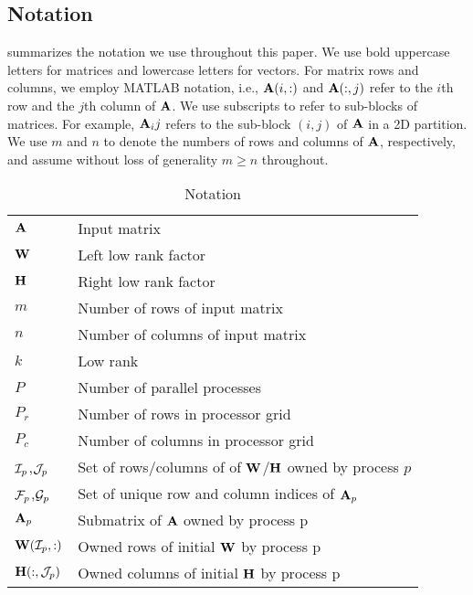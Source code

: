 \subsection{Notation}
\label{sec:notations}

 summarizes the notation we use throughout this paper.
We use bold uppercase letters for matrices and lowercase letters for vectors.
For matrix rows and columns, we employ MATLAB notation, i.e., $\AA(i, :)$ and $\AA(:, j)$ refer to the $i$th row and the $j$th column of $\AA$.
We use subscripts to refer to sub-blocks of matrices.
For example, $\AA_ij$ refers to the sub-block $(i, j)$ of $\AA$ in a 2D partition.
We use $m$ and $n$ to denote the numbers of rows and columns of $\AA$, respectively, and assume without loss of generality $m\geq n$ throughout.

\begin{table}%
\begin{center}
\begin{tabular}{|l|l|}
\hline
$\AA$ & Input matrix \\
$\WW$ & Left low rank factor \\
$\HH$ & Right low rank factor \\
$m$ & Number of rows of input matrix \\
$n$ & Number of columns of input matrix \\
$k$ & Low rank \\
$P$ & Number of parallel processes \\
$P_r$ & Number of rows in processor grid \\
$P_c$ & Number of columns in processor grid \\
$\Ip$,$\Jp$ & Set of rows/columns of of $\Wm$/$\Hm$ owned by process $p$  \\
$\Fp$,$\Gp$ & Set of unique row and column indices of $\Amp$ \\
$\Amp$ & Submatrix of $\Am$ owned by process p \\
$\Wm(\Ip,:)$ & Owned rows of initial $\Wm$ by process p \\
$\Hm(:,\Jp)$ & Owned columns of initial $\Hm$ by process p\\

\hline
\end{tabular}
\end{center}
\caption{Notation}
\label{tab:notation}
\end{table}%
